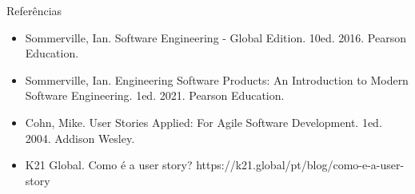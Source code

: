 \documentclass[11pt]{beamer}
\begin{document}
   \begin{frame}{Referências}
      \begin{itemize}
          \item Sommerville, Ian. Software Engineering - Global Edition. 10ed. 2016. Pearson Education.
          \item Sommerville, Ian. Engineering Software Products: An Introduction to Modern Software Engineering. 1ed. 2021. Pearson Education. 
          \item Cohn, Mike. User Stories Applied: For Agile Software Development. 1ed. 2004. Addison Wesley.
          \item K21 Global. Como é a user story? https://k21.global/pt/blog/como-e-a-user-story
      \end{itemize}
    \end{frame}
\end{document}

